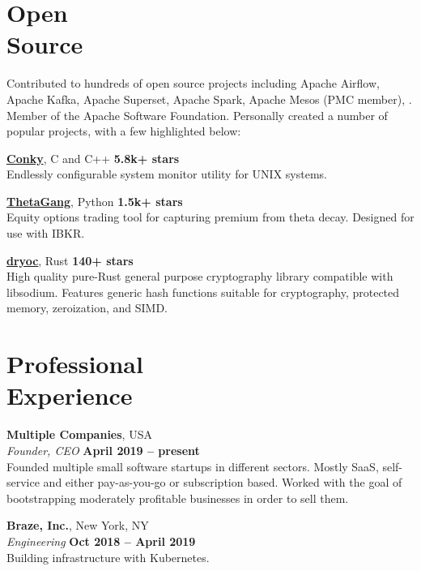 \documentclass[margin,line]{resume}
\begin{document}
\begin{resume}
    \section{\mysidestyle Open\\Source}

    Contributed to hundreds of open source projects including Apache Airflow,
    Apache Kafka, Apache Superset, Apache Spark, Apache Mesos (PMC member), . Member of the
    Apache Software Foundation. Personally created a number of popular projects,
    with a few highlighted below:

    \href{https://github.com/brndnmtthws/conky}{\textbf{Conky}}, C and C++ \hfill \textbf{5.8k+ stars}\\
    Endlessly configurable system monitor utility for UNIX systems.

    \href{https://github.com/brndnmtthws/thetagang}{\textbf{ThetaGang}}, Python \hfill \textbf{1.5k+ stars}\\
    Equity options trading tool for capturing premium from theta decay. Designed
    for use with IBKR.

    \href{https://github.com/brndnmtthws/dryoc}{\textbf{dryoc}}, Rust \hfill \textbf{140+ stars}\\
    High quality pure-Rust general purpose cryptography library compatible with
    libsodium.  Features generic hash functions suitable for cryptography,
    protected memory, zeroization, and SIMD.

    \vspace{3mm}

    \section{\mysidestyle Professional\\Experience}

    \textbf{Multiple Companies}, USA \vspace{2mm}\\\vspace{1mm}%
    \textsl{Founder, CEO} \hfill \textbf{April 2019 -- present}\\
    Founded multiple small software startups in different sectors. Mostly SaaS,
    self-service and either pay-as-you-go or subscription based. Worked with the
    goal of bootstrapping moderately profitable businesses in order to sell
    them.

    \textbf{Braze, Inc.}, New York, NY \vspace{2mm}\\\vspace{1mm}%
    \textsl{Engineering} \hfill \textbf{Oct 2018 -- April 2019}\\
    Building infrastructure with Kubernetes.
    

\end{resume}
\end{document}
